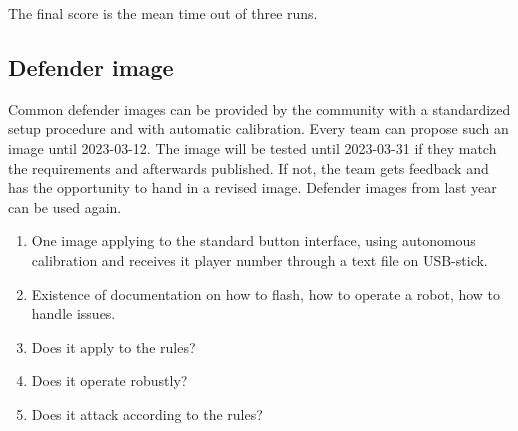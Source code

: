 The final score is the mean time out of three runs.

\subsection{Defender image}
\label{sec:Challenge_image}
Common defender images can be provided by the community with a standardized setup procedure and with automatic calibration. Every team can propose such an image until 2023-03-12. The image will be tested until 2023-03-31 if they match the requirements and afterwards published. If not, the team gets feedback and has the opportunity to hand in a revised image. Defender images from last year can be used again.

\begin{enumerate}
	\item One image applying to the standard button interface, using autonomous calibration and receives it player number through a text file on USB-stick.
	\item Existence of documentation on how to flash, how to operate a robot, how to handle issues.
	\item Does it apply to the rules?
	\item Does it operate robustly?
	\item Does it attack according to the rules?
\end{enumerate}
